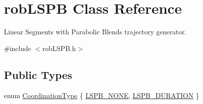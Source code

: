 \hypertarget{classrob_l_s_p_b}{}\section{rob\+L\+S\+P\+B Class Reference}
\label{classrob_l_s_p_b}


Linear Segments with Parabolic Blends trajectory generator.  




{\ttfamily \#include $<$rob\+L\+S\+P\+B.\+h$>$}

\subsection*{Public Types}
\begin{DoxyCompactItemize}
\item 
enum \hyperlink{classrob_l_s_p_b_a8feec61f7c94670dbdbe75e63dec8496}{Coordination\+Type} \{ \hyperlink{classrob_l_s_p_b_a8feec61f7c94670dbdbe75e63dec8496a6183520633c3003062fc1a7c013ced4b}{L\+S\+P\+B\+\_\+\+N\+O\+N\+E}, 
\hyperlink{classrob_l_s_p_b_a8feec61f7c94670dbdbe75e63dec8496a69d9016e53da35bc25239de96393ef0e}{L\+S\+P\+B\+\_\+\+D\+U\+R\+A\+T\+I\+O\+N}
 \}
\end{DoxyCompactItemize}
